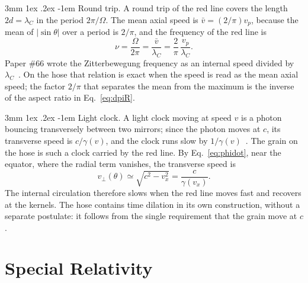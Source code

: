 \documentclass[%
 reprint, amsmath,amssymb, aps, prb, ]{revtex4-2}
\makeatletter
\numberwithin{equation}{section}
\renewcommand\paragraph{%
  \@startsection{paragraph}{4}{\z@}%
    {3mm \@plus 1ex \@minus .2ex}%
    {-1em}%
    {\normalfont\normalsize\itshape}}
\newcommand{\lamC}{\lambda_C}
\makeatother
\begin{document}
\paragraph{Round trip.} A round trip of the red line covers the length $2d = \lamC$ in the period $2\pi/\Omega$. The mean axial speed is $\bar v = (2/\pi)v_p$, because the mean of $|\sin\theta|$ over a period is $2/\pi$, and the frequency of the red line is
\begin{equation}
\nu = \frac{\Omega}{2\pi} = \frac{\bar v}{\lamC} = \frac{2}{\pi}\,\frac{v_p}{\lamC} .
\label{eq:nu}
\end{equation}
Paper \#66 wrote the Zitterbewegung frequency as an internal speed divided by $\lamC$~\cite{H66}. On the hose that relation is exact when the speed is read as the mean axial speed; the factor $2/\pi$ that separates the mean from the maximum is the inverse of the aspect ratio in Eq.~\eqref{eq:dpiR}.

\paragraph{Light clock.} A light clock moving at speed $v$ is a photon bouncing transversely between two mirrors; since the photon moves at $c$, its transverse speed is $c/\gamma(v)$, and the clock runs slow by $1/\gamma(v)$~\cite{TaylorWheeler1992}. The grain on the hose is such a clock carried by the red line. By Eq.~\eqref{eq:phidot}, near the equator, where the radial term vanishes, the transverse speed is
\begin{equation}
v_\perp(\theta) \simeq \sqrt{c^2 - v_x^2} = \frac{c}{\gamma(v_x)} .
\label{eq:clock}
\end{equation}
The internal circulation therefore slows when the red line moves fast and recovers at the kernels. The hose contains time dilation in its own construction, without a separate postulate: it follows from the single requirement that the grain move at $c$.

\section{Special Relativity}
\label{sec:sr}
\end{document}
